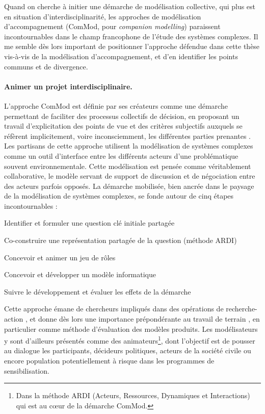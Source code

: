 Quand on cherche à initier une démarche de modélisation collective, qui plus est en situation d'interdisciplinarité, les approches de \og modélisation d'accompagnement\fg{} (\og ComMod\fg{}, pour \textit{companion modelling}) paraissent incontournables dans le champ francophone de l'étude des systèmes complexes.
Il me semble dès lors important de positionner l'approche défendue dans cette thèse vis-à-vis de la modélisation d'accompagnement, et d'en identifier les points communs et de divergence.

\paragraph{Animer un projet interdisciplinaire.}

L'approche ComMod est définie par ses créateurs comme \og une démarche permettant de faciliter des processus collectifs de décision, en proposant un travail d'explicitation des points de vue et des critères subjectifs auxquels se réfèrent implicitement, voire inconsciemment, les différentes parties prenantes\fg{} \autocite[167]{commod_modelisation_2005}.
Les partisans de cette approche utilisent la modélisation de systèmes complexes comme un outil d'interface entre les différents acteurs d'une problématique souvent environnementale.
Cette modélisation est pensée comme véritablement collaborative, le modèle servant de support de discussion et de négociation entre des acteurs parfois opposés.
La démarche mobilisée, bien ancrée dans le paysage de la modélisation de systèmes complexes, se fonde autour de \og cinq étapes incontournables\fg{} \autocite[41-132]{etienne_modelisation_2015} :
\begin{compactenum}\vspace*{-0.5em}
	\item Identifier et formuler une question clé initiale partagée
	\item Co-construire une représentation partagée de la question (méthode \og ARDI\fg{})
	\item Concevoir et animer un jeu de rôles
	\item Concevoir et développer un modèle informatique
	\item Suivre le développement et évaluer les effets de la démarche
\end{compactenum}\vspace*{-0.5em}

Cette approche émane de chercheurs impliqués dans des opérations de \og recherche-action\fg{} \autocite[165]{commod_modelisation_2005}, et donne dès lors une importance prépondérante au travail de terrain \autocite[3.3]{barreteau_our_2003}, en particulier comme méthode d'évaluation des modèles produits.
Les modélisateurs y sont d'ailleurs présentés comme des \og animateurs\fg{}\footnote{
	Dans la méthode \og ARDI \fg{} (Acteurs, Ressources, Dynamiques et Interactions) \autocite{etienne_co-construction_2009} qui est au cœur de la démarche ComMod.
}, dont l'objectif est de pousser au dialogue les \og participants\fg{}, décideurs politiques, acteurs de la société civile ou encore population potentiellement à risque dans les programmes de sensibilisation.

